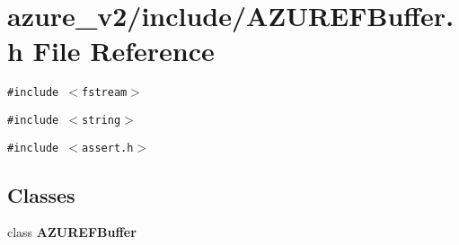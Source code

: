 \section{azure\_\-v2/include/AZUREFBuffer.h File Reference}
\label{AZUREFBuffer_8h}
{\tt \#include $<$fstream$>$}\par
{\tt \#include $<$string$>$}\par
{\tt \#include $<$assert.h$>$}\par
\subsection*{Classes}
\begin{CompactItemize}
\item 
class \bf{AZUREFBuffer}
\end{CompactItemize}
